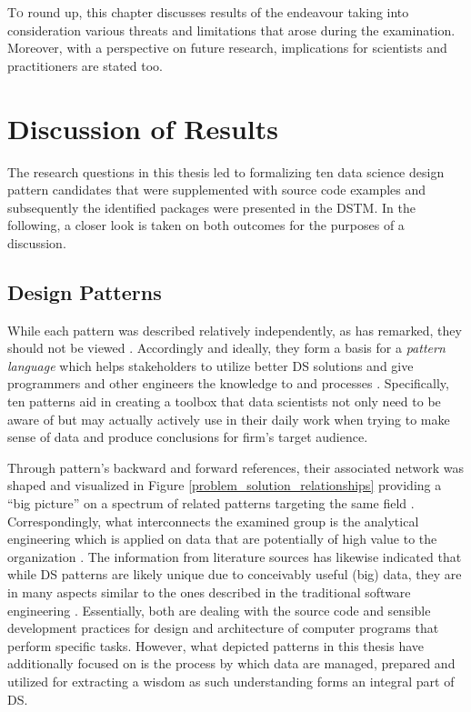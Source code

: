 \lettrine[lines=2]{\color{BrickRed}T}{o} round up, this chapter discusses results of the endeavour taking into consideration various threats and limitations that arose during the examination. 
Moreover, with a perspective on future research, implications for scientists and practitioners are stated too.

\section{Discussion of Results}
\label{Discussion}
The research questions in this thesis led to formalizing ten data science design pattern candidates that were supplemented with source code examples and subsequently the identified packages were presented in the \acl{DSTM}.
In the following, a closer look is taken on both outcomes for the purposes of a discussion. 

\subsection{Design Patterns}
While each pattern was described relatively independently, as \textcite[10]{Fowler2002} has remarked, they should not be viewed . 
Accordingly and ideally, they form a basis for a \emph{pattern language} which helps stakeholders to utilize better \ac{DS} solutions and give programmers and other engineers the knowledge to  and processes \parencites[15]{DPSummarySMS2016}.
Specifically, ten patterns aid in creating a toolbox that data scientists not only need to be aware of but may actually actively use in their daily work when trying to make sense of data and produce conclusions for firm's target audience.  

Through pattern's backward and forward references, their associated network was shaped and visualized in Figure \ref{problem_solution_relationships} providing a \enquote{big picture} on a spectrum of related patterns targeting the same field \parencite{DeardenHCI2006}.
Correspondingly, what interconnects the examined group is the analytical engineering which is applied on data that are potentially of high value to the organization \parencites{GarrettGrolemund2017RData}{FosterProvost2013DataThinking}{Ayankoya2014}.
The information from literature sources has likewise indicated that while \ac{DS} patterns are likely unique due to conceivably useful (big) data, they are in many aspects similar to the ones described in the traditional software engineering \parencites{GoF2002}{GoogleDebt1}.
Essentially, both are dealing with the source code and sensible development practices for design and architecture of computer programs that perform specific tasks. 
However, what depicted patterns in this thesis have additionally focused on is the process by which data are managed, prepared and utilized for extracting a wisdom as such understanding forms an integral part of \ac{DS}.

